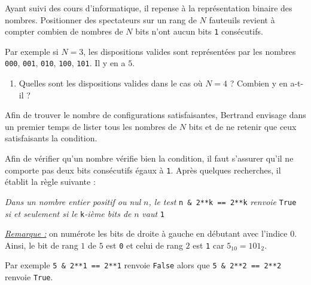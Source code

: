 \documentclass[a4paper, 11pt]{article}
\begin{document}

Ayant suivi des cours d'informatique, il repense à la représentation binaire des nombres.
Positionner des spectateurs sur un rang de $N$ fauteuils revient à compter combien de nombres de $N$ bits n'ont aucun bits \texttt{1} consécutifs.

Par exemple si $N=3$, les dispositions valides sont représentées par les nombres \texttt{000}, \texttt{001}, \texttt{010}, \texttt{100}, \texttt{101}. Il y en a $5$.

\begin{enumerate}
	\item Quelles sont les dispositions valides dans le cas où $N=4$ ? Combien y en a-t-il ?
\end{enumerate}

Afin de trouver le nombre de configurations satisfaisantes, Bertrand envisage dans un premier temps de lister tous les nombres de $N$ bits et de ne retenir que ceux satisfaisants la condition.

Afin de vérifier qu'un nombre vérifie bien la condition, il faut s'assurer qu'il ne comporte pas deux bits consécutifs égaux à \texttt{1}.
Après quelques recherches, il établit la règle suivante :
\begin{center}
	\guillemotleft\textit{Dans un nombre entier positif ou  nul} $n$\textit{, le test }\texttt{n \& 2**k == 2**k}\textit{ renvoie }\texttt{True}\\ \textit{si et seulement si le }\texttt{k}\textit{-ième bits de }$n$\textit{ vaut }\texttt{1}\guillemotright
\end{center}

\noindent\textit{\underline{Remarque :}} on numérote les bits de droite à gauche en débutant avec l'indice 0. Ainsi, le bit de rang $1$ de $5$ est \texttt{0} et celui de rang $2$ est \texttt{1} car $5_{10}=101_2$.

Par exemple \texttt{5 \& 2**1 == 2**1} renvoie \texttt{False} alors que \texttt{5 \& 2**2 == 2**2} renvoie \texttt{True}.
\end{document}
